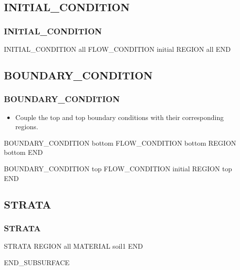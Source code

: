 \documentclass{beamer}
\newcommand\greencomment[1]{{{\color{green} #1}}}
\begin{document}
\subsection{INITIAL\_CONDITION}

\begin{frame}[fragile]\frametitle{INITIAL\_CONDITION}

\begin{semiverbatim}
INITIAL_CONDITION all
  FLOW_CONDITION initial
  REGION all
END
\end{semiverbatim}

\end{frame}

\subsection{BOUNDARY\_CONDITION}

\begin{frame}[fragile]\frametitle{BOUNDARY\_CONDITION}

\begin{itemize}
\item Couple the \greencomment{top} and \greencomment{top} boundary conditions with their corresponding regions.
\end{itemize}

\begin{semiverbatim}
BOUNDARY_CONDITION bottom
  FLOW_CONDITION bottom
  REGION bottom
END

BOUNDARY_CONDITION top
  FLOW_CONDITION initial
  REGION top
END
\end{semiverbatim}

\end{frame}


\subsection{STRATA}

\begin{frame}[fragile]\frametitle{STRATA}

\begin{semiverbatim}

STRATA
  REGION all
  MATERIAL soil1
END

END_SUBSURFACE

\end{semiverbatim}

\end{frame}
\end{document}
